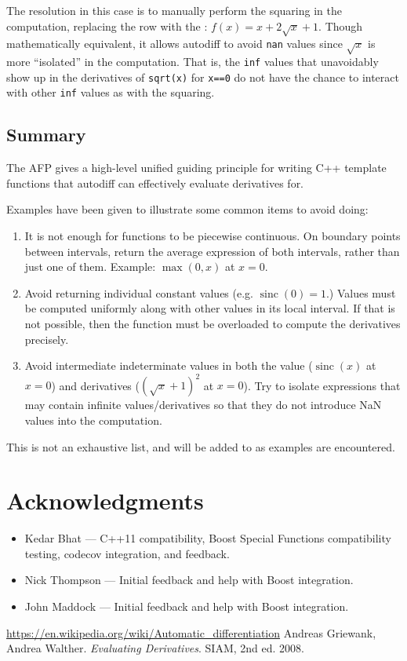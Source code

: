 \documentclass{article}
\DeclareMathOperator{\sinc}{sinc}
\begin{document}
The resolution in this case is to manually perform the squaring in the computation, replacing the  row
with the : $f(x)=x+2\sqrt{x}+1$. Though mathematically equivalent, it allows autodiff to avoid {\tt nan}
values since $\sqrt x$ is more ``isolated'' in the computation. That is, the {\tt inf} values that unavoidably
show up in the derivatives of {\tt sqrt(x)} for {\tt x==0} do not have the chance to interact with other {\tt inf}
values as with the squaring.

\subsection{Summary}

The AFP gives a high-level unified guiding principle for writing C++ template functions that autodiff can
effectively evaluate derivatives for.

Examples have been given to illustrate some common items to avoid doing:

\begin{enumerate}
\item It is not enough for functions to be piecewise continuous. On boundary points between intervals, return the
    average expression of both intervals, rather than just one of them. Example: $\max(0,x)$ at $x=0$.
\item Avoid returning individual constant values (e.g. $\sinc(0)=1$.) Values must be computed uniformly along
    with other values in its local interval. If that is not possible, then the function must be overloaded to
    compute the derivatives precisely.
\item Avoid intermediate indeterminate values in both the value ($\sinc(x)$ at $x=0$) and derivatives
    ($(\sqrt{x}+1)^2$ at $x=0$). Try to isolate expressions that may contain infinite values/derivatives so
    that they do not introduce NaN values into the computation.
\end{enumerate}
This is not an exhaustive list, and will be added to as examples are encountered.

\section{Acknowledgments}

\begin{itemize}
\item Kedar Bhat --- C++11 compatibility, Boost Special Functions compatibility testing, codecov integration,
    and feedback.
\item Nick Thompson --- Initial feedback and help with Boost integration.
\item John Maddock --- Initial feedback and help with Boost integration.
\end{itemize}

\begin{thebibliography}{1}
 \url{https://en.wikipedia.org/wiki/Automatic\_differentiation}
 Andreas Griewank, Andrea Walther. \textit{Evaluating Derivatives}. SIAM, 2nd ed. 2008.
\end{thebibliography}
\end{document}
